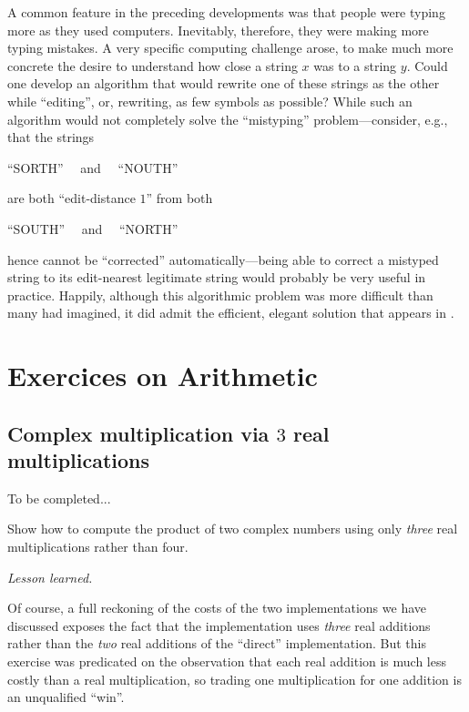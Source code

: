 A common feature in the preceding developments was that people were typing more as they used computers.  Inevitably, therefore, they were making more typing mistakes.  A very specific computing challenge arose, to make much more concrete the desire to understand how close a
string $x$ was to a string $y$.  Could one develop an algorithm that would rewrite one of these strings as the other while ``editing'', or, rewriting, as few symbols as possible?  While such an algorithm would not completely solve the ``mistyping'' problem---consider, e.g., that the strings

\hspace*{.25in} ``SORTH'' \ \ and \ \ ``NOUTH''

\noindent
are both ``edit-distance $1$'' from both

\hspace*{.25in} ``SOUTH'' \ \ and \ \ ``NORTH''

\noindent
hence cannot be ``corrected'' automatically---being able to correct a mistyped string to its edit-nearest legitimate string would probably be very useful in practice.  Happily, although this algorithmic problem was more difficult than many had imagined, it did admit the efficient, elegant solution that appears in \cite{WagnerF74}.


\section{Exercices on Arithmetic}

\subsection{Complex
  multiplication via $3$ real multiplications}

To be completed...
\medskip

Show how to compute the product of two complex numbers using only {\em three}
real multiplications rather than four.
\medskip

\noindent \textit{Lesson learned.}

Of course, a full reckoning of the costs of the two implementations we
have discussed exposes the fact that the implementation uses {\em
  three} real additions rather than the {\em two} real additions of
the ``direct'' implementation.  But this exercise was
predicated on the observation that each real addition is much less
costly than a real multiplication, so trading one multiplication for
one addition is an unqualified ``win''. 

